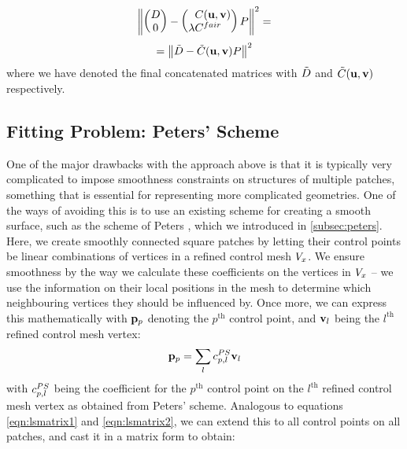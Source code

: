 \begin{equation*}
\norm{
\begin{pmatrix}
\lsDataPointMatrix \\ 0
\end{pmatrix} -
\begin{pmatrix*}[l]
\phantom{\lambda}\lsControlPointCoefMatrix(\vec{u},\vec{v}) \\ \lambda \lsControlPointCoefMatrix^{fair}
\end{pmatrix*}
\lsControlPointMatrix 
}^2 =
\end{equation*}
\begin{equation}
\label{eq:lsconcatmat}
= \norm{\lsDataPointConcMatrix - \lsControlCoefConcMatrix(\vec{u},\vec{v}) \lsControlPointMatrix }^2
\end{equation}
where we have denoted the final concatenated matrices with $\lsDataPointConcMatrix$ and $ \lsControlCoefConcMatrix(\vec{u},\vec{v})$ respectively.

\subsection{Fitting Problem: Peters' Scheme}
\label{subsub:petersleastsq}
One of the major drawbacks with the approach above is that it is typically very complicated to impose smoothness constraints on structures of multiple patches, something that is essential for representing more complicated geometries. One of the ways of avoiding this is to use an existing scheme for creating a smooth surface, such as the scheme of Peters \cite{peters1992constructing,eck1996automatic}, which we introduced in \autoref{subsec:peters}. Here, we create smoothly connected square \Bez patches by letting their control points be linear combinations of vertices in a refined control mesh $\petersPatchPoints$. We ensure smoothness by the way we calculate these coefficients on the vertices in $\petersPatchPoints$ -- we use the information on their local positions in the mesh to determine which neighbouring vertices they should be influenced by. Once more, we can express this mathematically with $\lsControlPointi{p}$ denoting the $p^\text{th}$ control point, and $\petersPatchPointVec_l$ being the $l^\text{th}$ refined control mesh vertex:
\begin{equation}
\lsControlPointi{p} = \sum\limits_{l} \petersControlPointCoef_{p,l} \petersPatchPointVec_l
\end{equation} 
with $\petersControlPointCoef_{p,l}$ being the coefficient for the $p^\text{th}$ \Bez control point on the $l^\text{th}$ refined control mesh vertex as obtained from Peters' scheme. Analogous to equations \ref{eqn:lsmatrix1} and \ref{eqn:lsmatrix2}, we can extend this to all \Bez control points on all patches, and cast it in a matrix form to obtain:

